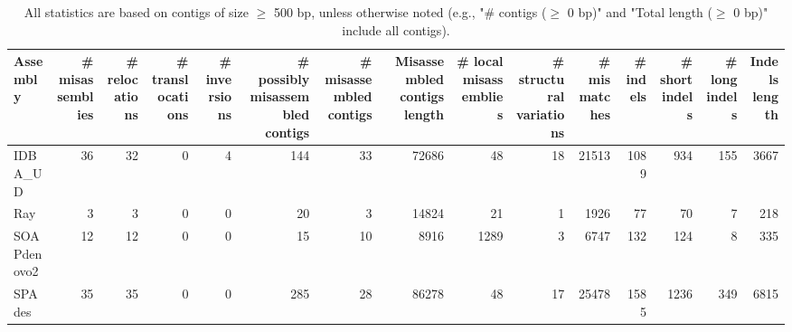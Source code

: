 \documentclass[12pt,a4paper]{article}
\begin{document}
\begin{table}[ht]
\begin{center}
\caption{All statistics are based on contigs of size $\geq$ 500 bp, unless otherwise noted (e.g., "\# contigs ($\geq$ 0 bp)" and "Total length ($\geq$ 0 bp)" include all contigs).}
\begin{tabular}{|l*{14}{|r}|}
\hline
Assembly & \# misassemblies &     \# relocations &     \# translocations &     \# inversions & \# possibly misassembled contigs & \# misassembled contigs & Misassembled contigs length & \# local misassemblies & \# structural variations & \# mismatches & \# indels &     \# short indels &     \# long indels & Indels length \\ \hline
IDBA\_UD & 36 & 32 & 0 & 4 & 144 & 33 & 72686 & 48 & 18 & 21513 & 1089 & 934 & 155 & 3667 \\ \hline
Ray & 3 & 3 & 0 & 0 & 20 & 3 & 14824 & 21 & 1 & 1926 & 77 & 70 & 7 & 218 \\ \hline
SOAPdenovo2 & 12 & 12 & 0 & 0 & 15 & 10 & 8916 & 1289 & 3 & 6747 & 132 & 124 & 8 & 335 \\ \hline
SPAdes & 35 & 35 & 0 & 0 & 285 & 28 & 86278 & 48 & 17 & 25478 & 1585 & 1236 & 349 & 6815 \\ \hline
\end{tabular}
\end{center}
\end{table}
\end{document}
